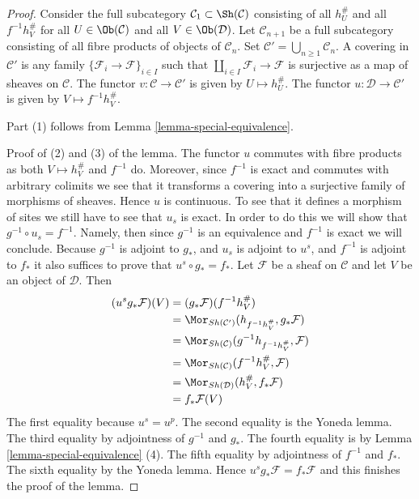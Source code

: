 \begin{proof}
Consider the full subcategory
$\mathcal{C}_1 \subset \Sh(\mathcal{C})$ consisting of all
$h_U^\#$ and all $f^{-1}h_V^\#$ for all
$U \in \Ob(\mathcal{C})$ and all $V \in \Ob(\mathcal{D})$.
Let $\mathcal{C}_{n + 1}$ be a full subcategory consisting of all
fibre products of objects of $\mathcal{C}_n$. Set
$\mathcal{C}' = \bigcup_{n \geq 1} \mathcal{C}_n$.
A covering in $\mathcal{C}'$ is any family
$\{\mathcal{F}_i \to \mathcal{F}\}_{i \in I}$ such that
$\coprod_{i \in I} \mathcal{F}_i \to \mathcal{F}$ is surjective
as a map of sheaves on $\mathcal{C}$.
The functor $v : \mathcal{C} \to \mathcal{C'}$ is given by
$U \mapsto h_U^\#$.
The functor $u : \mathcal{D} \to \mathcal{C'}$ is given by
$V \mapsto f^{-1}h_V^\#$.

\medskip\noindent
Part (1) follows from Lemma \ref{lemma-special-equivalence}.

\medskip\noindent
Proof of (2) and (3) of the lemma. The functor $u$ commutes with fibre
products as both $V \mapsto h_V^\#$ and $f^{-1}$ do. Moreover,
since $f^{-1}$ is exact and commutes with arbitrary colimits we see
that it transforms a covering into a surjective family of morphisms of
sheaves. Hence $u$ is continuous. To see that it defines a morphism of
sites we still have to see that $u_s$ is exact. In order to do this
we will show that $g^{-1} \circ u_s = f^{-1}$. Namely, then since $g^{-1}$
is an equivalence and $f^{-1}$ is exact we will conclude.
Because $g^{-1}$ is adjoint to $g_*$, and $u_s$ is adjoint to
$u^s$, and $f^{-1}$ is adjoint to $f_*$ it also suffices to prove that
$u^s \circ g_* = f_*$. Let $\mathcal{F}$ be a sheaf on $\mathcal{C}$
and let $V$ be an object of $\mathcal{D}$. Then
\begin{align*}
(u^s g_{\ast}\mathcal{F})(V)
& =
(g_{\ast}\mathcal{F})(f^{-1}h_V^\#) \\
& =
\Mor_{Sh(\mathcal{C}')}(h_{f^{-1}h_V^\#},g_{\ast}\mathcal{F}) \\
& =
\Mor_{Sh(\mathcal{C})}(g^{-1}h_{f^{-1}h_V^\#},\mathcal{F}) \\
& =
\Mor_{Sh(\mathcal{C})}(f^{-1}h_V^\#,\mathcal{F}) \\
& =
\Mor_{Sh(\mathcal{D})}(h_V^\#,f_{\ast}\mathcal{F}) \\
& =
f_{\ast}\mathcal{F}(V)
\end{align*}
The first equality because $u^s = u^p$.
The second equality is the Yoneda lemma.
The third equality by adjointness of $g^{-1}$ and $g_*$.
The fourth equality is by Lemma \ref{lemma-special-equivalence} (4).
The fifth equality by adjointness of $f^{-1}$ and $f_*$.
The sixth equality by the Yoneda lemma.
Hence $u^s g_*\mathcal{F} = f_*\mathcal{F}$ and
this finishes the proof of the lemma.
\end{proof}

